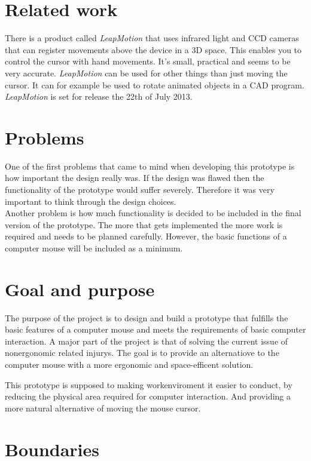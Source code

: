 \section{Related work}
There is a product called \emph{LeapMotion} that uses infrared light and CCD cameras that can
register movements above the device in a 3D space. This enables you to control the cursor with
hand movements. It's small, practical and seems to be very accurate. \emph{LeapMotion} can be
used for other things than just moving the cursor. It can for example be used to rotate animated
objects in a CAD program.\\
\emph{LeapMotion} is set for release the 22th of July 2013.\cite{LeapMotion}

\section{Problems}
One of the first problems that came to mind when developing this prototype is how important 
the design really was. If the design was flawed then the functionality of the prototype would 
suffer severely. Therefore it was very important to think through the design choices.\\

Another problem is how much functionality is decided to be included in the final 
version of the prototype. The more that gets implemented the more work is required
and needs to be planned carefully. However, the basic functions of a computer mouse will be 
included as a minimum.

\section{Goal and purpose}
The purpose of the project is to design and build a prototype that fulfills the basic features of 
a computer mouse and meets the requirements of basic computer interaction.
A major part of the project is that of solving the current issue of nonergonomic related injurys.   
The goal is to provide an alternatiove to the computer mouse with a more ergonomic and space-efficent solution. 

This prototype is supposed to making workenviroment it easier to conduct, by reducing the physical area required for computer interaction. 
And providing a more natural alternative of moving the mouse cursor.  

\section{Boundaries}
